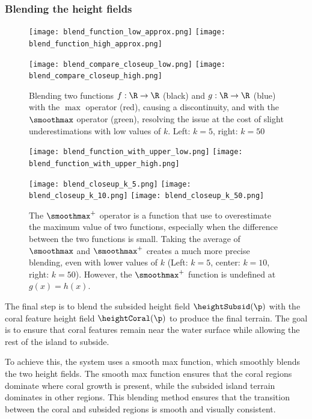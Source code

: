 \subsubsection{Blending the height fields}

\begin{figure}[H]
    \texttt{[image: blend\_function\_low\_approx.png]}
    \texttt{[image: blend\_function\_high\_approx.png]}

    \texttt{[image: blend\_compare\_closeup\_low.png]}
    \texttt{[image: blend\_compare\_closeup\_high.png]}
    \caption{Blending two functions $f: \R \to \R$ (black) and $g: \R \to \R$ (blue) with the $\max$ operator (red), causing a discontinuity, and with the $\smoothmax$ operator (green), resolving the issue at the cost of slight underestimations with low values of $k$. Left: $k=5$, right: $k=50$}
    \label{fig:coral-island_blend-function-island}
\end{figure}

\begin{figure}[H]
    \texttt{[image: blend\_function\_with\_upper\_low.png]}
    \texttt{[image: blend\_function\_with\_upper\_high.png]}

    \texttt{[image: blend\_closeup\_k\_5.png]}
    \texttt{[image: blend\_closeup\_k\_10.png]}
    \texttt{[image: blend\_closeup\_k\_50.png]}
    \caption{The $\smoothmax^+$ operator is a function that use to overestimate the maximum value of two functions, especially when the difference between the two functions is small. Taking the average of $\smoothmax$ and $\smoothmax^+$ creates a much more precise blending, even with lower values of $k$ (Left: $k=5$, center: $k=10$, right: $k=50$). However, the $\smoothmax^+$ function is undefined at $g(x) = h(x)$.}
    \label{fig:coral-island_blend-function-island-with-upper}
\end{figure}

The final step is to blend the subsided height field $\heightSubsid(\p)$ with the coral feature height field $\heightCoral(\p)$ to produce the final terrain. The goal is to ensure that coral features remain near the water surface while allowing the rest of the island to subside.

To achieve this, the system uses a smooth max function, which smoothly blends the two height fields. The smooth max function ensures that the coral regions dominate where coral growth is present, while the subsided island terrain dominates in other regions. This blending method ensures that the transition between the coral and subsided regions is smooth and visually consistent.

